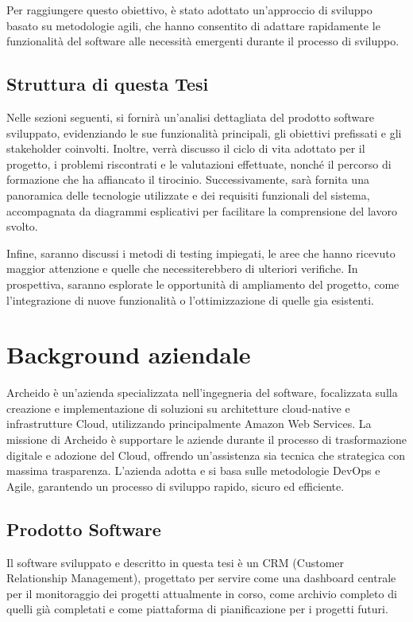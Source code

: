\documentclass[target=bach,aauheader=,style=]{thud}
\begin{document}
\noindent Per raggiungere questo obiettivo, è stato adottato un'approccio di sviluppo basato su metodologie agili, che hanno consentito di adattare rapidamente le funzionalità del software alle necessità emergenti durante il processo di sviluppo.

\section{Struttura di questa Tesi}

Nelle sezioni seguenti, si fornirà un'analisi dettagliata del prodotto software sviluppato, evidenziando le sue funzionalità principali, gli obiettivi prefissati e gli stakeholder coinvolti. Inoltre, verrà discusso il ciclo di vita adottato per il progetto, i problemi riscontrati e le valutazioni effettuate, nonché il percorso di formazione che ha affiancato il tirocinio. Successivamente, sarà fornita una panoramica delle tecnologie utilizzate e dei requisiti funzionali del sistema, accompagnata da diagrammi esplicativi per facilitare la comprensione del lavoro svolto. 

\noindent Infine, saranno discussi i metodi di testing impiegati, le aree che hanno ricevuto maggior attenzione e quelle che necessiterebbero di ulteriori verifiche. In prospettiva, saranno esplorate le opportunità di ampliamento del progetto, come l'integrazione di nuove funzionalità o l'ottimizzazione di quelle gia esistenti. 

\chapter{Background aziendale}
Archeido \cite{archeido2024} è un'azienda specializzata nell'ingegneria del software, focalizzata sulla creazione e implementazione di soluzioni su architetture cloud-native e infrastrutture Cloud, utilizzando principalmente Amazon Web Services. La missione di Archeido è supportare le aziende durante il processo di trasformazione digitale e adozione del Cloud, offrendo un'assistenza sia tecnica che strategica con massima trasparenza. L'azienda adotta e si basa sulle metodologie DevOps e Agile, garantendo un processo di sviluppo rapido, sicuro ed efficiente.

\section{Prodotto Software}
Il software sviluppato e descritto in questa tesi è un CRM (Customer Relationship Management), progettato per servire come una dashboard centrale per il monitoraggio dei progetti attualmente in corso, come archivio completo di quelli già completati e come piattaforma di pianificazione per i progetti futuri.
\end{document}
